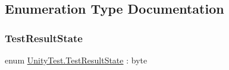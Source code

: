 \subsection{Enumeration Type Documentation}
\mbox{\label{namespace_unity_test_ae932964473328b231e595f94d61ccc3b}} 
\subsubsection{\texorpdfstring{Test\+Result\+State}{TestResultState}}
{\footnotesize\ttfamily enum \hyperlink{namespace_unity_test_ae932964473328b231e595f94d61ccc3b}{Unity\+Test.\+Test\+Result\+State} \+: byte\hspace{0.3cm}{\ttfamily [strong]}}


